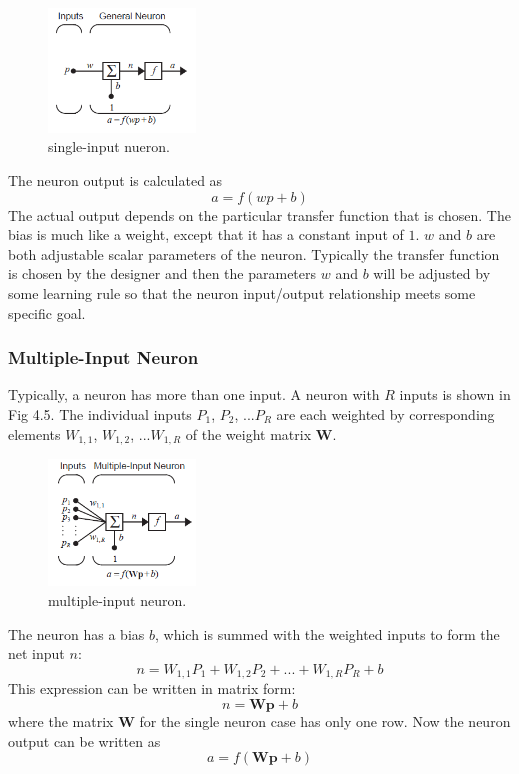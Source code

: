 \documentclass[12pt, a4paper, twoside]{report}
\begin{document}
\begin{figure}[ht]
	\centering
	\includegraphics[width=0.35\textwidth]
	{images/chapter4/single_input_neuron}
	\caption{single-input nueron.}
	\label{fig:single_input_neuron}
\end{figure}

The neuron output is calculated as
\begin{equation*}
a = f(wp + b)
\end{equation*}
The actual output depends on the particular transfer function that is chosen. The bias is much like a weight, except that it has a constant input of $1$. $w$ and $b$ are both adjustable scalar parameters of the neuron. Typically the transfer function is chosen by the designer and then the parameters $w$ and $b$ will be adjusted by some learning rule so that the neuron input/output relationship meets some specific goal.

\subsubsection{Multiple-Input Neuron}
Typically, a neuron has more than one input. A neuron with $R$ inputs is shown in Fig 4.5. The individual inputs $P_1$, $P_2$, ...$P_R$ are each weighted by corresponding elements $W_{1,1}$, $W_{1,2}$, ...$W_{1,R}$ of the weight matrix $\mathbf{W}$.

\begin{figure}[ht]
	\centering
	\includegraphics[width=0.35\textwidth]
	{images/chapter4/multiple_input_neuron}
	\caption{multiple-input neuron.}
	\label{fig:multiple_input_neuron}
\end{figure}

The neuron has a bias $b$, which is summed with the weighted inputs to form the net input $n$:
\begin{equation*}
n = W_{1,1}P_{1} + W_{1,2}P_{2} + ... + W_{1,R}P_{R} + b
\end{equation*}
This expression can be written in matrix form:
\begin{equation*}
n = \mathbf{Wp} + b
\end{equation*}
where the matrix $\mathbf{W}$ for the single neuron case has only one row. Now the neuron output can be written as
\begin{equation*}
a = f(\mathbf{Wp} + b)
\end{equation*}
\end{document}
